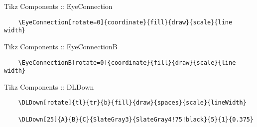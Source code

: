 \documentclass[9pt,svgnames,x11names]{beamer}
\begin{document}

\begin{frame}[fragile]{Tikz Components :: EyeConnection}

    \footnotesize
    \begin{verbatim}
    \EyeConnection[rotate=0]{coordinate}{fill}{draw}{scale}{line width}
  \end{verbatim}

    \vspace{1cm}
    \centering


\end{frame}


\begin{frame}[fragile]{Tikz Components :: EyeConnectionB}

    \small
    \begin{verbatim}
    \EyeConnectionB[rotate=0]{coordinate}{fill}{draw}{scale}{line width}
  \end{verbatim}

    \vspace{1cm}
    \centering

\end{frame}


\begin{frame}[fragile]{Tikz Components :: DLDown}

    \footnotesize
    \begin{verbatim}
    \DLDown[rotate]{tl}{tr}{b}{fill}{draw}{spaces}{scale}{lineWidth}

    \DLDown[25]{A}{B}{C}{SlateGray3}{SlateGray4!75!black}{5}{1}{0.375}
  \end{verbatim}
    \centering

\end{frame}
\end{document}
